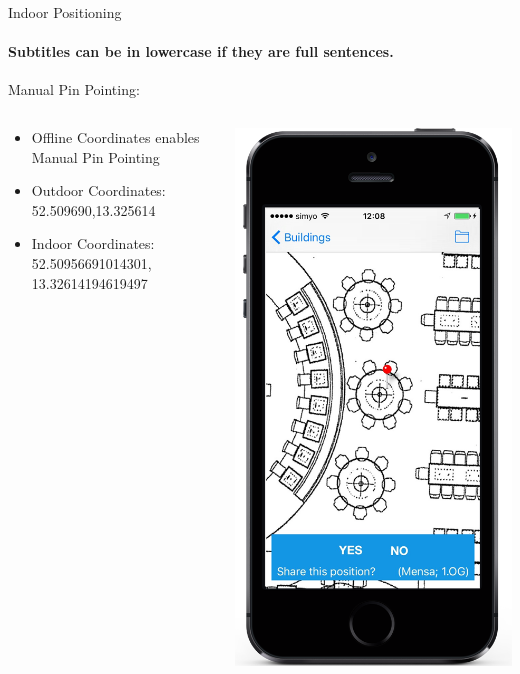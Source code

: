 \documentclass[11pt]{beamer}
\begin{document}
\begin{frame}{Indoor Positioning}

\framesubtitle{Subtitles can be in lowercase if they are full sentences.}
Manual Pin Pointing:

  \begin{columns}[T]
  \begin{column}{.6\textwidth}
  \begin{itemize}
 \item Offline Coordinates enables Manual Pin Pointing
 \item Outdoor Coordinates: 52.509690,13.325614
 \item Indoor Coordinates: 52.50956691014301, 13.32614194619497

  \end{itemize}
  \end{column}
  \begin{column}{.4\textwidth}
  \includegraphics[scale=0.25]{mappinpointa}

\end{column}
\end{columns}
\end{frame}
\end{document}
